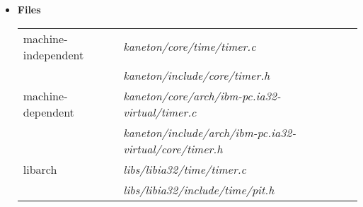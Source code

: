 \begin{itemize}
{	   The  argument specifies if the timer
	   must be re-inserted once expired.

	   See appendix for an example of call.
	 }

	 {
	   This function releases a timer object.
	 }

	 {
	   This function updates the delay.
	 }

	 {
	   This function updates the repeat property.
	 }

	 {
	   This function combines the effect of the two previous one.
	 }

	 {
	   This function returns in  the timer object
	   corresponding to .
	 }

	 {
	   This function initializes the timer manager.
	 }

	 {
	   This function cleans the timer manager.
	 }

  \item {\bf Files}\\

    \begin{tabular}{| l | l |}
      \hline
      machine-independent & {\em kaneton/core/time/timer.c}\\
      &  {\em kaneton/include/core/timer.h}\\\hline
      machine-dependent & {\em kaneton/core/arch/ibm-pc.ia32-virtual/timer.c}\\
      & {\em kaneton/include/arch/ibm-pc.ia32-virtual/core/timer.h}\\\hline
      libarch & {\em libs/libia32/time/timer.c}\\
      &  {\em libs/libia32/include/time/pit.h}\\\hline
    \end{tabular}

\end{itemize}

%
%

